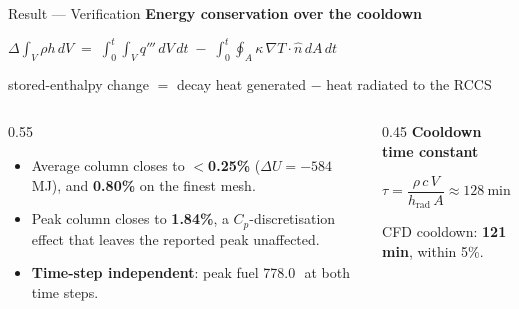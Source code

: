 \documentclass[aspectratio=169, 11pt, t]{beamer}
\newcommand{\key}[1]{\textbf{#1}}
\begin{document}
\begin{frame}{Result --- Verification}
{\color{RadNavy}\bfseries Energy conservation over the cooldown}
\vspace{4pt}
\begin{tcolorbox}[navybox]
\centering
$\displaystyle \Delta\!\!\int_V \rho h\,dV \;=\; \int_0^t\!\!\int_V q'''\,dV\,dt \;-\; \int_0^t\!\!\oint_A \kappa\,\nabla T\!\cdot\!\hat n\,dA\,dt$
\end{tcolorbox}
\vspace{2pt}
\centerline{\footnotesize\color{midGray}stored-enthalpy change $=$ decay heat generated $-$ heat radiated to the RCCS}
\vspace{8pt}

\begin{columns}[T]
\begin{column}{0.55\textwidth}
\begin{itemize}\setlength\itemsep{6pt}\small
  \item Average column closes to \key{$<$0.25\%} ($\Delta U = -584$\,MJ), and \key{0.80\%} on the finest mesh.
  \item Peak column closes to \key{1.84\%}, a $C_p$-discretisation effect that leaves the reported peak unaffected.
  \item \key{Time-step independent}: peak fuel 778.0\,\textcelsius\ at both time steps.
\end{itemize}
\end{column}
\begin{column}{0.45\textwidth}
{\color{RadNavy}\bfseries Cooldown time constant}
\vspace{4pt}
\begin{tcolorbox}[tealbox]
\centering
$\tau = \dfrac{\rho\,c\,V}{h_\text{rad}\,A} \approx 128\ \text{min}$
\end{tcolorbox}
\vspace{4pt}
{\footnotesize CFD cooldown: \key{121\,min}, within 5\%.}
\end{column}
\end{columns}
\end{frame}
\end{document}
